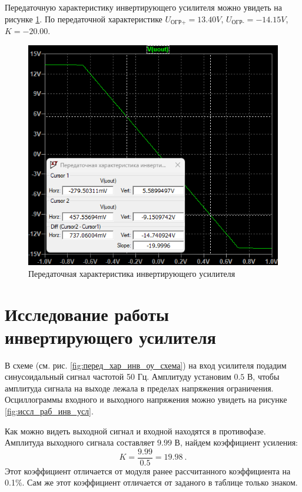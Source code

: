Передаточную характеристику инвертирующего усилителя можно увидеть на рисунке
\ref{fig:перед_хар_инв_оу}. По передаточной характеристике $U_{\text{ОГР+}}=13.40V$, 
$U_{\text{ОГР-}}=-14.15V$, $K=-20.00$.

\begin{figure}[H]
    \centering
    \includegraphics[width=\textwidth]{figs/перед_хар_инв_оу.png}
    \caption{Передаточная характеристика инвертирующего усилителя}
    \label{fig:перед_хар_инв_оу}
\end{figure}

\section*{Исследование работы инвертирующего усилителя}

В схеме (см. рис. \ref{fig:перед_хар_инв_оу_схема}) на вход усилителя подадим 
синусоидальный сигнал частотой 50 Гц. Амплитуду установим $0.5$ В, чтобы амплитуда
сигнала на выходе лежала в пределах напряжения ограничения. Осциллограммы входного
и выходного напряжения можно увидеть на рисунке \ref{fig:иссл_раб_инв_усл}.

Как можно видеть выходной сигнал и входной находятся в противофазе. 
Амплитуда выходного сигнала составляет $9.99$ В, найдем
коэффициент усиления:
\begin{equation*}
    K=\frac{9.99}{0.5}=19.98\ .
\end{equation*}
Этот коэффициент отличается от модуля ранее рассчитанного коэффициента на 0.1\%.
Сам же этот коэффициент отличается от заданого в таблице только знаком.

